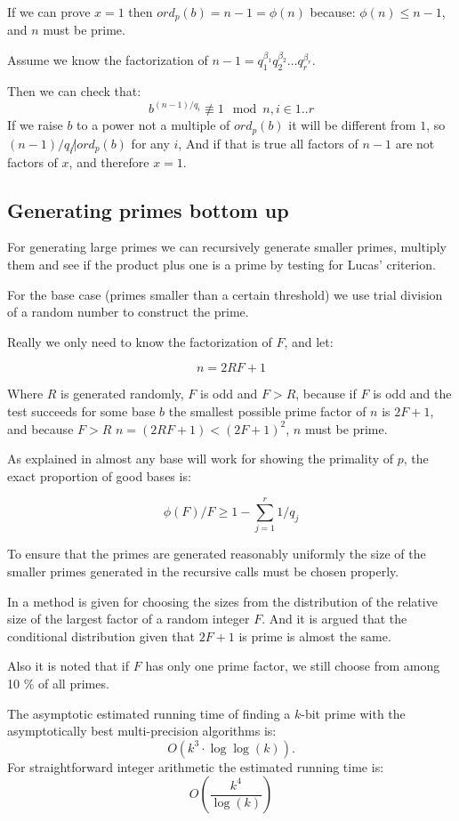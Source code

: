 \documentclass[11pt,a4paper]{article}
\begin{document}
If we can prove $x=1$ then $ord_p(b)=n-1=\phi(n)$ because: $\phi(n) \leq
n-1$, and $n$ must be prime.

Assume we know the factorization of $n-1 = q_1^{\beta_1}q_2^{\beta_2}\ldots q_r^{\beta_r}$.

Then we can check that:
\[b^{(n-1)/q_i}\not\equiv 1 \mod n, i\in{1..r}\] If we raise $b$
to a power not a multiple of $ord_p(b)$ it will be different from $1$,
so $(n-1)/q_i\not|ord_p(b)$ for any $i$, And if that is true all
factors of $n-1$ are not factors of $x$, and therefore $x=1$.
\subsection{Generating primes bottom up}
For generating large primes we can recursively generate smaller
primes, multiply them and see if the product plus one is a prime by
testing for Lucas' criterion.

For the base case (primes smaller than a certain threshold) we use
trial division of a random number to construct the prime.

Really we only need to know the factorization of $F$, and let:

\[n = 2RF+1\] 

Where $R$ is generated randomly, $F$ is odd and $F>R$, because if $F$
is odd and the test succeeds for some base $b$ the smallest possible
prime factor of $n$ is $2F+1$, and because $F>R$ $n=(2RF+1)<(2F+1)^2$,
$n$ must be prime.

As explained in \cite{Mihailescu:1994:FGP} almost any base will work
for showing the primality of $p$, the exact proportion of good bases
is:

\[\phi(F)/F \geq 1-\sum^r_{j=1}1/q_j\]

To ensure that the primes are generated reasonably uniformly the size
of the smaller primes generated in the recursive calls must be chosen
properly.

In \cite{Mihailescu:1994:FGP} a method is given for choosing the sizes
from the distribution of the relative size of the largest factor of a
random integer $F$. And it is argued that the conditional distribution
given that $2F+1$ is prime is almost the same.

Also it is noted that if $F$ has only one prime factor, we still
choose from among 10 \% of all primes.

The asymptotic estimated running time of finding a $k$-bit prime with the
asymptotically best multi-precision algorithms is:
\[O(k^3\cdot\log\log(k)).\]
For straightforward integer arithmetic the estimated running time is:
\[O(\frac{k^{4}}{\log(k)})\]
\end{document}
